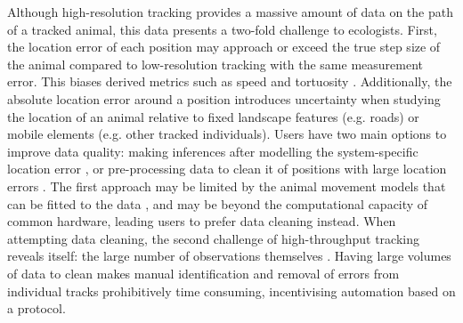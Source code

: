 \documentclass[10pt,paper=a4,headings=standardclasses
]{scrartcl}
\begin{document}
Although high-resolution tracking provides a massive amount of data on the path of a tracked animal, this data presents a two-fold challenge to ecologists.
First, the location error of each position may approach or exceed the true step size of the animal compared to low-resolution tracking with the same measurement error.
This biases derived metrics such as speed and tortuosity \citep[see][]{ranacher2016, noonan2019, hurford2009, calenge2009}.
Additionally, the absolute location error around a position introduces uncertainty when studying the location of an animal relative to fixed landscape features (e.g. roads) or mobile elements (e.g. other tracked individuals).
Users have two main options to improve data quality: making inferences after modelling the system-specific location error \citep{fleming2014a, fleming2020, jonsen2003, jonsen2005, johnson2008, patterson2008, aspillaga2021}, or pre-processing data to clean it of positions with large location errors \citep{bjorneraas2010}.
The first approach may be limited by the animal movement models that can be fitted to the data \citep{fleming2014a, noonan2019, fleming2020}, and may be beyond the computational capacity of common hardware, leading users to prefer data cleaning instead.
When attempting data cleaning, the second challenge of high-throughput tracking reveals itself: the large number of observations themselves \citep{weiser2016, toledo2020}.
Having large volumes of data to clean makes manual identification and removal of errors from individual tracks prohibitively time consuming, incentivising automation based on a protocol.
\end{document}
